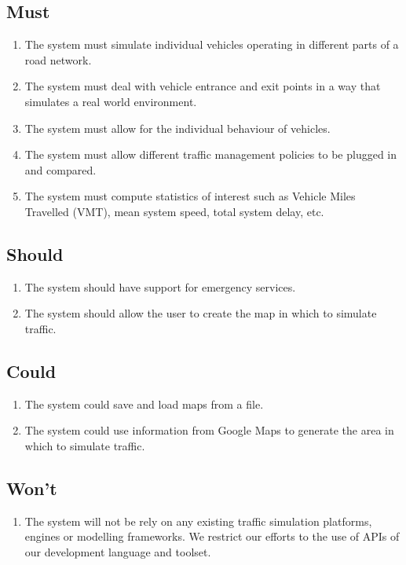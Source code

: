 \documentclass[11pt,a4paper]{article}
\begin{document}
\subsection{Must}
\label{section:must}
\begin{enumerate}
  \item The system must simulate individual vehicles operating in different parts of a road network.
  \item The system must deal with vehicle entrance and exit points in a way that simulates a real world environment.
  \item The system must allow for the individual behaviour of vehicles.
  \item The system must allow different traffic management policies to be plugged in and compared.
  \item The system must compute statistics of interest such as Vehicle Miles Travelled (VMT), mean system speed, total system delay, etc. 
\end{enumerate}

\subsection{Should}
\begin{enumerate}
  \item The system should have support for emergency services.
  \item The system should allow the user to create the map in which to simulate traffic.
\end{enumerate}

\subsection{Could}
\begin{enumerate}
  \item The system could save and load maps from a file.
  \item The system could use information from Google Maps to generate the area in which to simulate traffic.
\end{enumerate}

\subsection{Won't}
\begin{enumerate}
  \item The system will not be rely on any existing traffic simulation platforms, engines or modelling frameworks.  We restrict our efforts to the use of APIs of our development language and toolset.
\end{enumerate}
\end{document}
